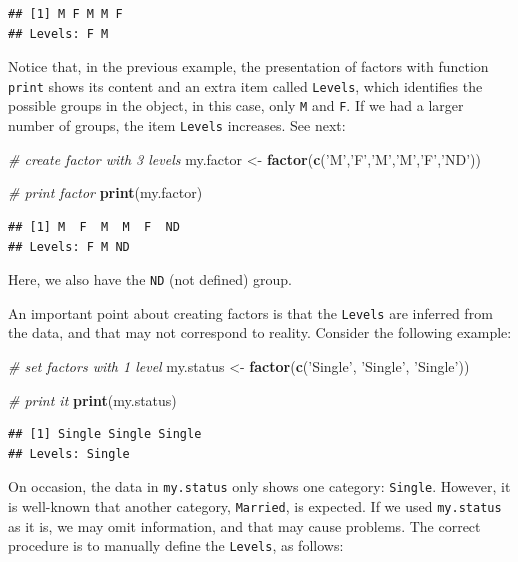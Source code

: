 \documentclass[11pt,]{book}
\newenvironment{Shaded}{\begin{snugshade}}{\end{snugshade}}
\newcommand{\KeywordTok}[1]{\textcolor[rgb]{0.27,0.27,0.27}{\textbf{#1}}}
\newcommand{\StringTok}[1]{\textcolor[rgb]{0.5,0.5,0.5}{#1}}
\newcommand{\CommentTok}[1]{\textcolor[rgb]{0.56,0.35,0.01}{\textit{#1}}}
\newcommand{\NormalTok}[1]{#1}
\begin{document}
\begin{verbatim}
## [1] M F M M F
## Levels: F M
\end{verbatim}

Notice that, in the previous example, the presentation of factors with
function \texttt{print} shows its content and an extra item called
\texttt{Levels}, which identifies the possible groups in the object, in
this case, only \texttt{M} and \texttt{F}. If we had a larger number of
groups, the item \texttt{Levels} increases. See next: 

\begin{Shaded}
\begin{Highlighting}[]
\CommentTok{# create factor with 3 levels}
\NormalTok{my.factor <-}\StringTok{ }\KeywordTok{factor}\NormalTok{(}\KeywordTok{c}\NormalTok{(}\StringTok{'M'}\NormalTok{,}\StringTok{'F'}\NormalTok{,}\StringTok{'M'}\NormalTok{,}\StringTok{'M'}\NormalTok{,}\StringTok{'F'}\NormalTok{,}\StringTok{'ND'}\NormalTok{))}

\CommentTok{# print factor}
\KeywordTok{print}\NormalTok{(my.factor)}
\end{Highlighting}
\end{Shaded}

\begin{verbatim}
## [1] M  F  M  M  F  ND
## Levels: F M ND
\end{verbatim}

Here, we also have the \texttt{ND} (not defined) group.

An important point about creating factors is that the \texttt{Levels}
are inferred from the data, and that may not correspond to reality.
Consider the following example:

\begin{Shaded}
\begin{Highlighting}[]
\CommentTok{# set factors with 1 level}
\NormalTok{my.status <-}\StringTok{ }\KeywordTok{factor}\NormalTok{(}\KeywordTok{c}\NormalTok{(}\StringTok{'Single'}\NormalTok{, }\StringTok{'Single'}\NormalTok{, }\StringTok{'Single'}\NormalTok{))}

\CommentTok{# print it}
\KeywordTok{print}\NormalTok{(my.status)}
\end{Highlighting}
\end{Shaded}

\begin{verbatim}
## [1] Single Single Single
## Levels: Single
\end{verbatim}

On occasion, the data in \texttt{my.status} only shows one category:
\texttt{Single}. However, it is well-known that another category,
\texttt{Married}, is expected. If we used \texttt{my.status} as it is,
we may omit information, and that may cause problems. The correct
procedure is to manually define the \texttt{Levels}, as follows:
\end{document}
